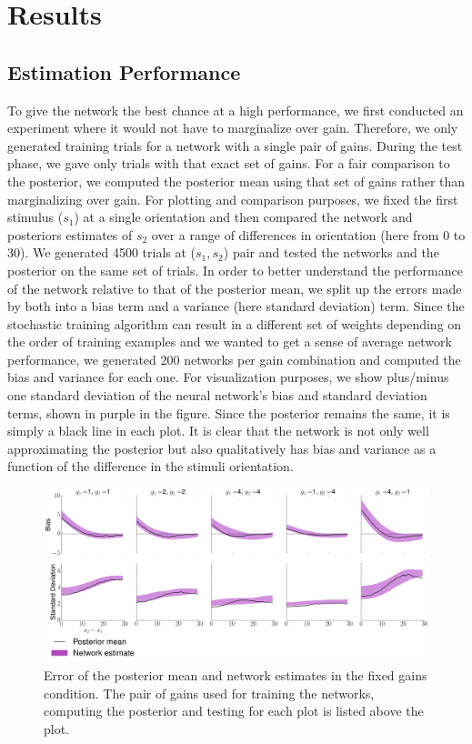 \documentclass{article} %
\begin{document}
\section{Results}
\subsection{Estimation Performance}
To give the network the best chance at a high performance, we first conducted an experiment where it would not have to marginalize over gain. Therefore, we only generated training trials for a network with a single pair of gains. During the test phase, we gave only trials with that exact set of gains. For a fair comparison to the posterior, we computed the posterior mean using that set of gains rather than marginalizing over gain. For plotting and comparison purposes, we fixed the first stimulus ($s_1$) at a single orientation and then compared the network and posteriors estimates of $s_2$ over a range of differences in orientation (here from 0 to 30). We generated 4500 trials at ($s_1, s_2$) pair and tested the networks and the posterior on the same set of trials. In order to better understand the performance of the network relative to that of the posterior mean, we split up the errors made by both into a bias term and a variance (here standard deviation) term. Since the stochastic training algorithm can result in a different set of weights depending on the order of training examples and we wanted to get a sense of average network performance, we generated 200 networks per gain combination and computed the bias and variance for each one. For visualization purposes, we show plus/minus one standard deviation of the neural network's bias and standard deviation terms, shown in purple in the figure. Since the posterior remains the same, it is simply a black line in each plot. It is clear that the network is not only well approximating the posterior but also qualitatively has bias and variance as a function of the difference in the stimuli orientation.
\begin{figure}[h]
\centering
\includegraphics[width = \textwidth]{Fixed_Gains.png}
\caption{Error of the posterior mean and network estimates in the fixed gains condition. The pair of gains used for training the networks, computing the posterior and testing for each plot is listed above the plot.}
\end{figure}
\end{document}
